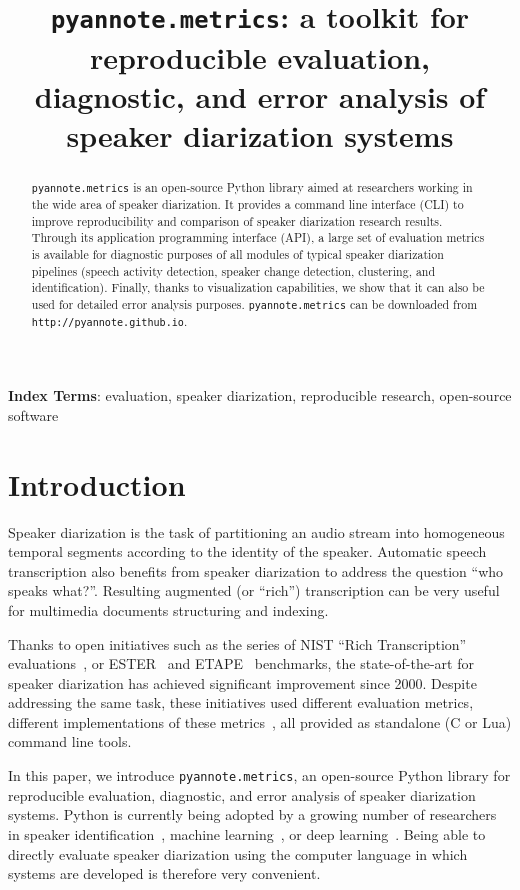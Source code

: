 \documentclass[a4paper]{article}
\title{\texttt{\Large{pyannote.metrics}}: a toolkit for reproducible evaluation,\\ diagnostic, and error analysis of speaker diarization systems}
\newcommand*\metrics{\texttt{\footnotesize{pyannote.metrics}}}
\newcommand*\github{\texttt{\footnotesize{http://pyannote.github.io}}}
\begin{document}
\maketitle
%
\begin{abstract}
\metrics{} is an open-source Python library aimed at researchers working in the wide area of speaker diarization.
It provides a command line interface (CLI) to improve reproducibility and comparison of speaker diarization research results. Through its application programming interface (API), a large set of evaluation metrics is available for diagnostic purposes of all modules of typical speaker diarization pipelines (speech activity detection, speaker change detection, clustering, and identification). Finally, thanks to visualization capabilities, we show that it can also be used for detailed error analysis purposes. \metrics{} can be downloaded from \github{}.
\end{abstract}
\noindent\textbf{Index Terms}: evaluation, speaker diarization, reproducible research, open-source software

\section{Introduction}

Speaker diarization is the task of partitioning an audio stream into homogeneous temporal segments according to the identity of the speaker.
Automatic speech transcription also benefits from speaker diarization to address the question ``who speaks what?''.
Resulting augmented (or ``rich'') transcription can be very useful for multimedia documents structuring and indexing.

Thanks to open initiatives such as the series of NIST ``Rich Transcription'' evaluations~\cite{Fiscus2006}, or ESTER~\cite{Galliano2005} and  ETAPE~\cite{Gravier2012} benchmarks, the state-of-the-art for speaker diarization has achieved significant improvement since 2000.
Despite addressing the same task, these initiatives used different evaluation metrics, different implementations of these metrics~\cite{NIST-RT03, Galibert2013}, all provided as standalone (C or Lua) command line tools.

In this paper, we introduce \metrics{}, an open-source Python library for reproducible evaluation, diagnostic, and error analysis of speaker diarization systems.
Python is currently being adopted by a growing number of researchers in speaker identification~\cite{sidekit, Bob2012}, machine learning~\cite{scikit-learn}, or deep learning~\cite{tensorflow2015-whitepaper}.
Being able to directly evaluate speaker diarization using the computer language in which systems are developed is therefore very convenient.
\end{document}
